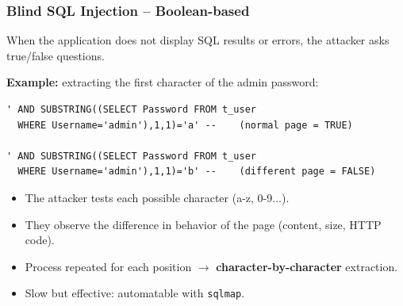 \documentclass{beamer}
\def\emptyline{\vspace{10pt}}
\begin{document}
\begin{frame}[fragile]
\frametitle{Blind SQL Injection -- Boolean-based}

When the application \alert{does not display} SQL results or errors, the attacker asks true/false questions.

\emptyline
\textbf{Example:} extracting the first character of the admin password:
\begin{lstlisting}[basicstyle=\ttfamily\scriptsize,frame=single]
' AND SUBSTRING((SELECT Password FROM t_user
  WHERE Username='admin'),1,1)='a' --    (normal page = TRUE)

' AND SUBSTRING((SELECT Password FROM t_user
  WHERE Username='admin'),1,1)='b' --    (different page = FALSE)
\end{lstlisting}

\begin{itemize}
\item The attacker tests each possible character (a-z, 0-9...).
\item They observe the \alert{difference in behavior} of the page (content, size, HTTP code).
\item Process repeated for each position $\rightarrow$ \textbf{character-by-character} extraction.
\item Slow but effective: automatable with \texttt{sqlmap}.
\end{itemize}
\end{frame}
\end{document}
